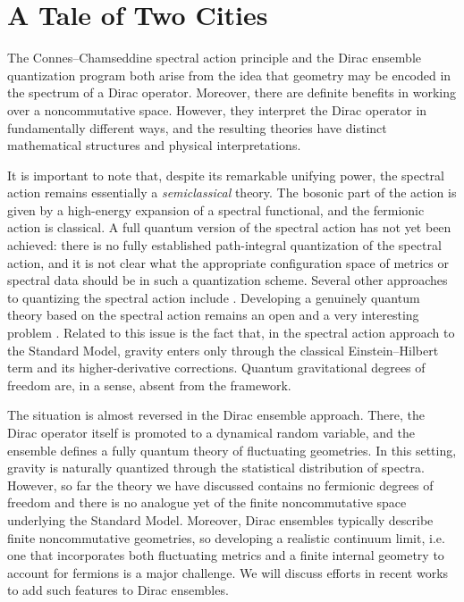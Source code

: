 \documentclass[11pt]{article}
\theoremstyle{plain}
\begin{document}
\section{A Tale of Two Cities} 


The Connes--Chamseddine spectral action principle \cite{Spectral action, QFTNCG, Neutrino Mixing} and the Dirac 
ensemble quantization program \cite{Barrett2016, hessam2022fromnoncom} both arise from the idea that geometry may be
encoded in the spectrum of a Dirac operator. Moreover, there are definite benefits
in working over a noncommutative space. However, they interpret the
Dirac operator in fundamentally different ways, and the resulting theories
have distinct mathematical structures and physical interpretations. 

It is important to note that, despite its remarkable unifying power, the
spectral action remains essentially a \emph{semiclassical} theory. The bosonic
part of the action is given by a high-energy expansion of a spectral
functional, and the fermionic action is classical. A full quantum version of
the spectral action has not yet been achieved: there is no fully established
path-integral quantization of the spectral action, and it is not clear what
the appropriate configuration space of metrics or spectral data should be in such
a quantization scheme. Several other approaches to quantizing the spectral action include \cite{vanN2022one,vanN2023,gakkhar2024spectral,Sanchez quivers,Sanchez loop equations}. Developing a genuinely quantum theory based on the
spectral action remains an open and a very interesting  problem \cite{van2024}. Related to this issue
is the fact that, in the spectral action approach to the Standard Model, 
gravity enters only through the classical Einstein--Hilbert term and its
higher-derivative corrections. Quantum gravitational degrees of freedom are, 
in a sense, absent from the framework.

The situation is almost reversed in the Dirac ensemble approach. There, the
Dirac operator itself is promoted to a dynamical random variable, and the ensemble
defines a fully quantum theory of fluctuating geometries. In this setting,
gravity is naturally quantized through the statistical distribution of spectra.
However, so far the theory we have discussed contains no fermionic degrees of freedom and there is no analogue yet of the finite noncommutative space underlying the
Standard Model. Moreover, Dirac ensembles typically describe finite
noncommutative geometries, so developing a realistic continuum limit,  i.e. one
that incorporates both fluctuating metrics and a finite internal geometry to account for fermions is
a major challenge. We will discuss efforts in recent works \cite{Barrett2024,Sanchez Yang-Mills,Khalkhali2025 large N limit} to add such features to Dirac ensembles.
\end{document}
